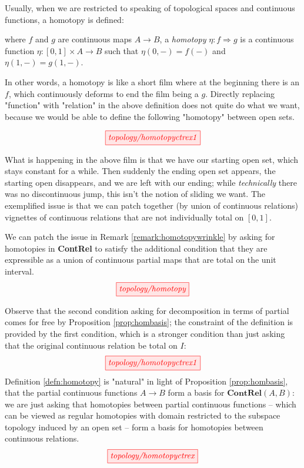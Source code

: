 \begin{myboxR}
\begin{remark}\label{remark:homotopywrinkle}
Usually, when we are restricted to speaking of topological spaces and continuous functions, a homotopy is defined:
\end{remark}

\begin{defn}
where $f$ and $g$ are continuous maps $A \rightarrow B$, a \emph{homotopy} $\eta : f \Rightarrow g$ is a continuous function $\eta : [0,1] \times A \rightarrow B$ such that $\eta(0,-) = f(-)$ and $\eta(1,-) = g(1,-)$.
\end{defn}

In other words, a homotopy is like a short film where at the beginning there is an $f$, which continuously deforms to end the film being a $g$. Directly replacing "function" with "relation" in the above definition does not quite do what we want, because we would be able to define the following "homotopy" between open sets.

\[\tikzfig{topology/homotopyctrex1}\]

What is happening in the above film is that we have our starting open set, which stays constant for a while. Then suddenly the ending open set appears, the starting open disappears, and we are left with our ending; while \emph{technically} there was no discontinuous jump, this isn't the notion of sliding we want. The exemplified issue is that we can patch together (by union of continuous relations) vignettes of continuous relations that are not individually total on $[0,1]$.
\end{myboxR}

\begin{myboxB}
\begin{defn}\label{defn:homotopy}
We can patch the issue in Remark \ref{remark:homotopywrinkle} by asking for homotopies in \textbf{ContRel} to satisfy the additional condition that they are expressible as a union of continuous partial maps that are total on the unit interval.
\[\tikzfig{topology/homotopy}\]
\end{defn}
\end{myboxB}

\begin{myboxR}
\begin{remark}
Observe that the second condition asking for decomposition in terms of partial comes for free by Proposition \ref{prop:hombasis}; the constraint of the definition is provided by the first condition, which is a stronger condition than just asking that the original continuous relation be total on $I$:
\[\tikzfig{topology/homotopyctrex1}\]
Definition \ref{defn:homotopy} is "natural" in light of Proposition \ref{prop:hombasis}, that the partial continuous functions $A \rightarrow B$ form a basis for $\mathbf{ContRel}(A,B)$: we are just asking that homotopies between partial continuous functions -- which can be viewed as regular homotopies with domain restricted to the subspace topology induced by an open set -- form a basis for homotopies between continuous relations.
\[\tikzfig{topology/homotopyctrex}\]
\end{remark}
\end{myboxR}

